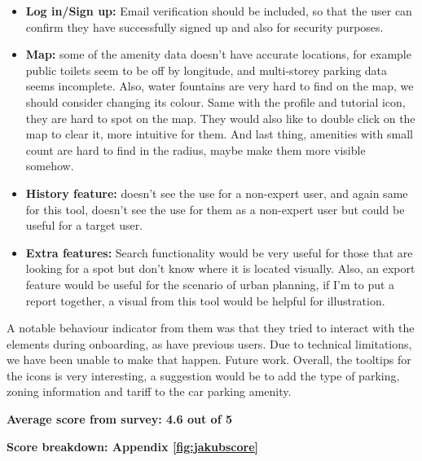 \begin{itemize}
  \item \textbf{Log in/Sign up: }Email verification should be included, so
        that the user can confirm they have successfully signed up and also for
        security purposes.
        \vspace{0.2cm}
        
  \item \textbf{Map: }some of the amenity data doesn't have accurate
        locations, for example public toilets seem to be off by longitude, and
        multi-storey parking data seems incomplete. Also, water fountains are very
        hard to find on the map, we should consider changing its colour. Same with
        the profile and tutorial icon, they are hard to spot on the map. They would
        also like to double click on the map to clear it, more intuitive for them.
        And last thing, amenities with small count are hard to find in the radius,
        maybe make them more visible somehow.
        \vspace{0.2cm}
        
  \item \textbf{History feature: }doesn't see the use for a non-expert user,
        and again same for this tool, doesn't see the use for them as a non-expert
        user but could be useful for a target user.
        \vspace{0.2cm}
        
  \item \textbf{Extra features: }Search functionality would be very useful for
        those that are looking for a spot but don't know where it is located
        visually. Also, an export feature would be useful for the scenario of urban
        planning, if I'm to put a report together, a visual from this tool would be
        helpful for illustration.
\end{itemize}

\newpage{}

A notable behaviour indicator from them was that they tried to interact with the
elements during onboarding, as have previous users. Due to technical
limitations, we have been unable to make that happen. Future work.
Overall, the tooltips for the icons is very interesting, a suggestion would be
to add the type of parking, zoning information and tariff to the car parking
amenity.

\textbf{Average score from survey: 4.6 out of 5}

\textbf{Score breakdown: Appendix \ref{fig:jakubscore}}

